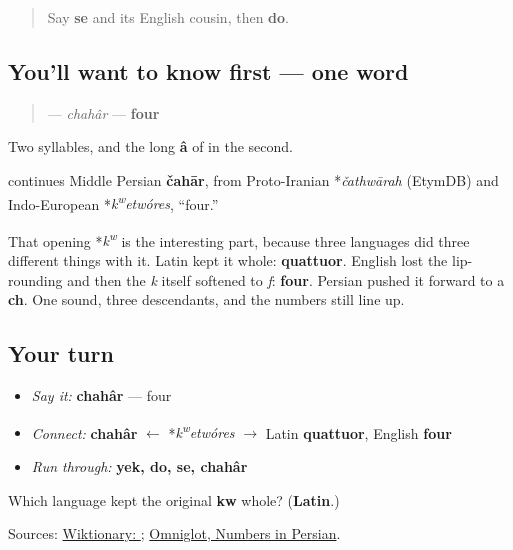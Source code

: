 \label{lesson:FA-C16-chahar}



\begin{quote}
Say \textbf{se} and its English cousin, then \textbf{do}.
\end{quote}

\subsection*{You'll want to know first — one word}
\begin{quote}
\textbf{} — \emph{chahâr} — \textbf{four}
\end{quote}

Two syllables, and the long \textbf{â} of \textbf{} in the second.

\begin{cousinweb}
\textbf{} continues Middle Persian \textbf{čahār}, from Proto-Iranian *\emph{čathwārah} (EtymDB) and Indo-European *\emph{k\textsuperscript{w}etwóres}, \textquotedblleft{}four.\textquotedblright{}

That opening *\emph{k\textsuperscript{w}} is the interesting part, because three languages did three different things with it. Latin kept it whole: \textbf{quattuor}. English lost the lip-rounding and then the \emph{k} itself softened to \emph{f}: \textbf{four}. Persian pushed it forward to a \textbf{ch}. One sound, three descendants, and the numbers still line up.
\end{cousinweb}

\subsection*{Your turn}
\begin{itemize}
\raggedright
  \item \emph{Say it:} \textbf{chahâr} — four
  \item \emph{Connect:} \textbf{chahâr} $\leftarrow$ *\emph{k\textsuperscript{w}etwóres} $\to$ Latin \textbf{quattuor}, English \textbf{four}
  \item \emph{Run through:} \textbf{yek, do, se, chahâr}
\end{itemize}

\begin{tcolorbox}[breakable,colback=teal!4,colframe=teal!35!black,title={Before you move on}]
Which language kept the original \textbf{kw} whole? (\textbf{Latin}.)

Sources: \href{https://en.wiktionary.org/wiki/\%DA\%86\%D9\%87\%D8\%A7\%D8\%B1}{Wiktionary: }; \href{https://www.omniglot.com/language/numbers/persian.htm}{Omniglot, Numbers in Persian}.
\end{tcolorbox}
